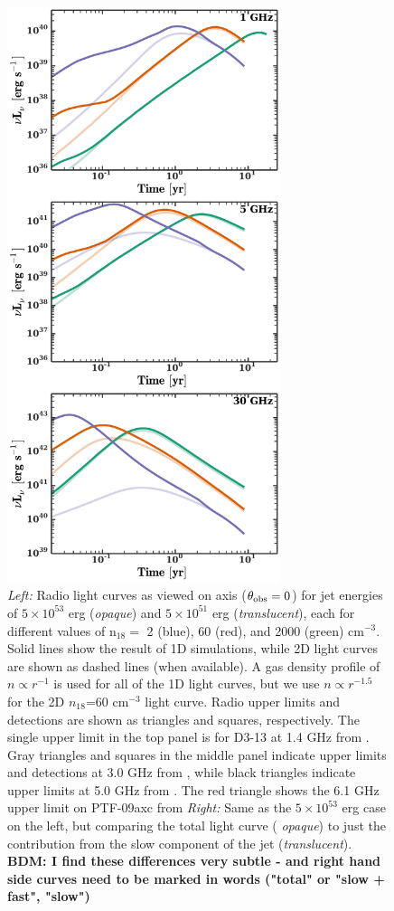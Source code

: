 \documentclass[usenatbib,fleqn]{mnras}
\begin{document}
\begin{figure}
  \includegraphics[width=8cm]{lightcurves_comp.pdf}
  \caption{\label{fig:lightcurves} \textit{Left:} Radio light curves
    as viewed on axis ($\theta_{\rm obs}=0$) for jet energies of
    $5\times 10^{53}$ erg ({\it opaque}) and $5\times 10^{51}$ erg
    ({\it translucent}), each for different values of n$_{18}=$ 2
    (blue), 60 (red), and 2000 (green) cm$^{-3}$.  Solid lines show
    the result of 1D simulations, while 2D light curves are shown as
    dashed lines (when available).  A gas density profile of $n\propto
    r^{-1}$ is used for all of the 1D light curves, but we use
    $n\propto r^{-1.5}$ for the 2D $n_{18}$=60 cm$^{-3}$ light curve.
    Radio upper limits and detections are shown as triangles and
    squares, respectively.  The single upper limit in the top panel is
    for D3-13 at 1.4 GHz from \citet{Bower2011}.  Gray triangles and
    squares in the middle panel indicate upper limits and detections
    at 3.0 GHz from \citet{Bower+2013}, while black triangles indicate
    upper limits at 5.0 GHz from \citet{van-Velzen+2013}.  The red
    triangle shows the 6.1 GHz upper limit on PTF-09axc from
    \citet{Arcavi+2014} \textit{Right:} Same as the $5\times 10^{53}$
    erg case on the left, but comparing the total light curve ({\it
      opaque}) to just the contribution from the slow component of the
    jet ({\it translucent}).  {\bf BDM: I find these differences very
      subtle - and right hand side curves need to be marked in words
      ("total" or "slow + fast", "slow")}}
\end{figure}
\end{document}
